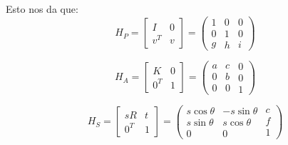 \documentclass[11pt]{scrartcl} %
\begin{document}
Esto nos da que:
\begin{equation}
	H_{P} = \begin{bmatrix}I & 0 \\ v^{T} & v\end{bmatrix} = 
	\left( 
		\begin{array}{c}1 \\ 0 \\ g\end{array} 
		\begin{array}{c}0 \\ 1 \\ h\end{array} 
		\begin{array}{c}0 \\ 0 \\ i\end{array} 
	\right)
\end{equation}


\begin{equation}
	H_{A} = \begin{bmatrix}K & 0 \\ 0^{T} & 1\end{bmatrix} = 
	\left( 
		\begin{array}{c}a \\ 0 \\ 0\end{array} 
		\begin{array}{c}c \\ b \\ 0\end{array} 
		\begin{array}{c}0 \\ 0 \\ 1\end{array} 
	\right)
\end{equation}

\begin{equation}
	H_{S} = \begin{bmatrix}sR & t \\ 0^{T} & 1\end{bmatrix} = 
	\left( 
		\begin{array}{c}s\cos\theta \\ s\sin\theta \\ 0\end{array} 
		\begin{array}{c}-s\sin\theta \\ s\cos\theta \\ 0\end{array} 
		\begin{array}{c}c \\ f \\ 1\end{array} 
	\right)
\end{equation}
\end{document}
